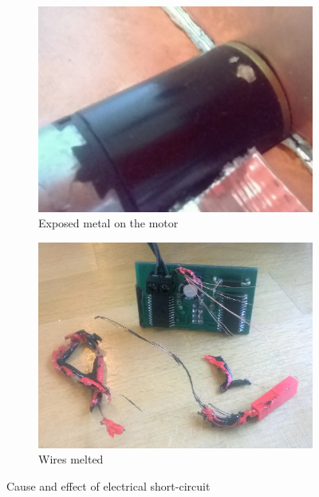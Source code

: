 \documentclass[main.tex]{subfiles}
\begin{document}
	\begin{figure}
		\begin{subfigure}[t]{0.5\linewidth-1em}
			\includegraphics[width=\linewidth]{figures/short-motor.jpg}
			\caption{Exposed metal on the motor}
			\label{fig:short:cause}
		\end{subfigure}\hfill
		\begin{subfigure}[t]{0.5\linewidth-1em}
			\includegraphics[width=\linewidth]{figures/wires.jpg}
			\caption{Wires melted}
			\label{fig:short:wires}
		\end{subfigure}
		\caption{Cause and effect of electrical short-circuit}
		\label{fig:short}
	\end{figure}
\end{document}

